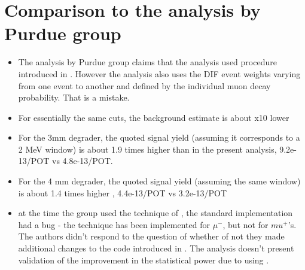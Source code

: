 \section{Comparison to the analysis by Purdue group}

\begin{itemize}
\item
  The analysis by Purdue group claims that the analysis used procedure introduced
  in \cite{KRZYSZTOF}. However the analysis also uses the DIF event weights
  varying from one event to another and defined by the individual muon decay probability.
  That is a mistake.
\item
  For essentially the same cuts, the background estimate is about x10 lower
\item
  For the 3mm degrader, the quoted signal yield (assuming it corresponds to a 2 MeV window)
  is about 1.9 times higher than in the present analysis, 9.2e-13/POT vs 4.8e-13/POT.
\item
  For the 4 mm degrader, the quoted signal yield (assuming the same window) 
  is about 1.4 times higher , 4.4e-13/POT vs 3.2e-13/POT
\item
  at the time the group used the technique of \cite{KRZYSZTOF}, the standard implementation
  had a bug - the technique has been implemented for $\mu^-$, but not for $mu^+$'s.
  The authors didn't respond to the question of whether of not
  they made additional changes to the code introduced in \cite{KRZYSZTOF}.
  The analysis doesn't present validation of the improvement in the statistical power due
  to using \cite{KRZYSZTOF}. 
\end{itemize}
